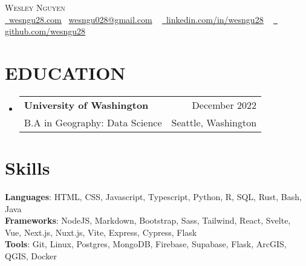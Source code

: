 \documentclass[letterpaper,11pt]{article}
\makeatletter
\newcommand{\resumeSubheading}[4]{
  \vspace{-2pt}\item
    \begin{tabular*}{0.97\textwidth}[t]{l@{\extracolsep{\fill}}r}
      \textbf{#1} & #2 \\
      {\small#3} & {\small #4} \\
    \end{tabular*}\vspace{-7pt}
}
\newcommand{\resumeSubHeadingListStart}{\begin{itemize}[leftmargin=0.15in, label={}]}
\newcommand{\resumeSubHeadingListEnd}{\end{itemize}}
\makeatother
\begin{document}

\begin{center}
    {\Huge \scshape Wesley Nguyen} \\ \vspace{4pt}\href{https://wesngu28.com}{\raisebox{-0.2\height}\ \underline{wesngu28.com}} {\raisebox{-0.2\height}\  \underline{wesngu028@gmail.com}} ~
    \href{https://linkedin.com/in/wesngu28/}{\raisebox{-0.2\height}\ \underline{linkedin.com/in/wesngu28}}  ~
    \href{https://github.com/wesngu28}{\raisebox{-0.2\height}\ \underline{ github.com/wesngu28}}
    \vspace{-8pt}
\end{center}


\section{EDUCATION}
  \resumeSubHeadingListStart
    \resumeSubheading
      {University of Washington}{December 2022}
      {B.A in Geography: Data Science}{Seattle, Washington}
  \resumeSubHeadingListEnd

\section{Skills}
 \begin{itemize}[leftmargin=0.15in, label={}]
    \small{\item{
     \textbf{Languages}{: HTML, CSS, Javascript, Typescript, Python, R, SQL, Rust, Bash, Java} \\
     \vspace{3pt}
     \textbf{Frameworks}{: NodeJS, Markdown, Bootstrap, Sass, Tailwind, React, Svelte, Vue, Next.js, Nuxt.js, Vite, Express, Cypress, Flask} \\
     \vspace{3pt}
     \textbf{Tools}{: Git, Linux, Postgres, MongoDB, Firebase, Supabase, Flask, ArcGIS, QGIS, Docker} \\
    }}
 \end{itemize}
\end{document}
